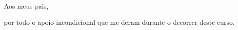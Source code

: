 \dedicatory

Aos meus pais,

por todo o apoio incondicional que me deram durante o decorrer deste curso.

\enddedicatory